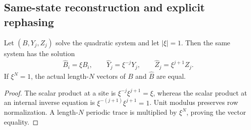 \subsection{Same-state reconstruction and explicit rephasing}
\label{sec:quadratic_same_state_converse}

\begin{lemma}
    \label{lem:quadratic_solution_rephasing}
    \leanok
    Let $(B,Y_j,Z_j)$ solve the quadratic system and let $|\xi|=1$.
    Then the same system has the solution
    \begin{align}
        \widehat B_i=\xi B_i,\qquad
        \widehat Y_j=\xi^{-j}Y_j,\qquad
        \widehat Z_j=\xi^{j+1}Z_j.
    \end{align}
    If $\xi^N=1$, the actual length-$N$ vectors of $B$ and
    $\widehat B$ are equal.
\end{lemma}
\begin{proof}
    \leanok
    The scalar product at a site is $\xi^{-j}\xi^{j+1}=\xi$,
    whereas the scalar product at an internal inverse equation is
    $\xi^{-(j+1)}\xi^{j+1}=1$. Unit modulus preserves row
    normalization. A length-$N$ periodic trace is multiplied by
    $\xi^N$, proving the vector equality.
\end{proof}

